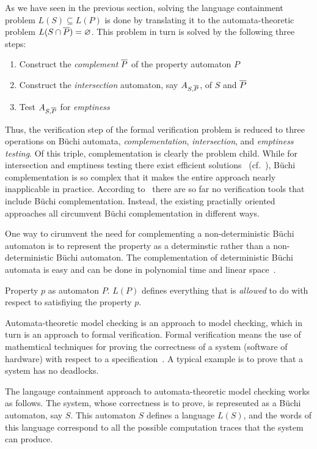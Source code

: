 As we have seen in the previous section, solving the language containment problem $L(S) \subseteq L(P)$ is done by translating it to the automata-theoretic problem $L(S \cap \cl1{P}) = \varnothing$. This problem in turn is solved by the following three steps:

\begin{enumerate}
\item Construct the \textit{complement} $\cl1{P}$ of the property automaton $P$
\item Construct the \textit{intersection} automaton, say $A_{S,\cl1{P}}$, of $S$ and $\cl1{P}$
\item Test $A_{S,\cl1{P}}$ for \textit{emptiness}
\end{enumerate}

Thus, the verification step of the formal verification problem is reduced to three operations on Büchi automata, \textit{complementation}, \textit{intersection}, and \textit{emptiness testing}. Of this triple, complementation is clearly the problem child. While for intersection and emptiness testing there exist efficient solutions~\cite{2007_vardi_model_checking} (cf.~\cite{1996_vardi}), Büchi complementation is so complex that it makes the entire approach nearly inapplicable in practice. According to~\cite{2007_vardi_model_checking} there are so far no verification tools that include Büchi complementation. Instead, the existing practially oriented approaches all circumvent Büchi complementation in different ways.

One way to cirumvent the need for complementing a non-deterministic Büchi automaton is to represent the property as a determinstic rather than a non-deterministic Büchi automaton.
The complementation of deterministic Büchi automata is easy and can be done in polynomial time and linear space~\cite{Kurshan198759}.


Property $p$ as automaton $P$. $L(P)$ defines everything that is \textit{allowed} to do with respect to satisfiying the property $p$.


Automata-theoretic model checking is an approach to model checking, which in turn is an approach to formal verification. Formal verification means the use of mathemtical techniques for proving the correctness of a system (software of hardware) with respect to a specification~\cite{2007_vardi_model_checking}. A typical example is to prove that a system has no deadlocks.

The langauge containment approach to automata-theoretic model checking works as follows. The system, whose correctness is to prove, is represented as a Büchi automaton, say $S$. This automaton $S$ defines a language $L(S)$, and the words of this language correspond to all the possible computation traces that the system can produce.

